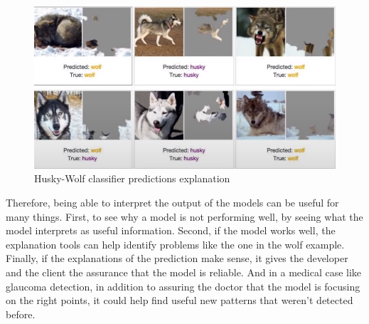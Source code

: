 \documentclass[11pt, a4paper]{article}
\begin{document}
\begin{figure}[H]
	\centering
	\includegraphics[width=14cm]{imgs/general/Husky-Wolf classifier predictions explanation.PNG}
	\caption{Husky-Wolf classifier predictions explanation}
	 \label{fig:Husky-Wolf classifier predictions explanation}
\end{figure}
\noindent Therefore, being able to interpret the output of the models can be useful for many things. First, to see why a model is not performing well, by seeing what the model interprets as useful information. Second, if the model works well, the explanation tools can help identify problems like the one in the wolf example. Finally, if the explanations of the prediction make sense, it gives the developer and the client the assurance that the model is reliable. And in a medical case like glaucoma detection, in addition to assuring the doctor that the model is focusing on the right points, it could help find useful new patterns that weren't detected before.
\end{document}
